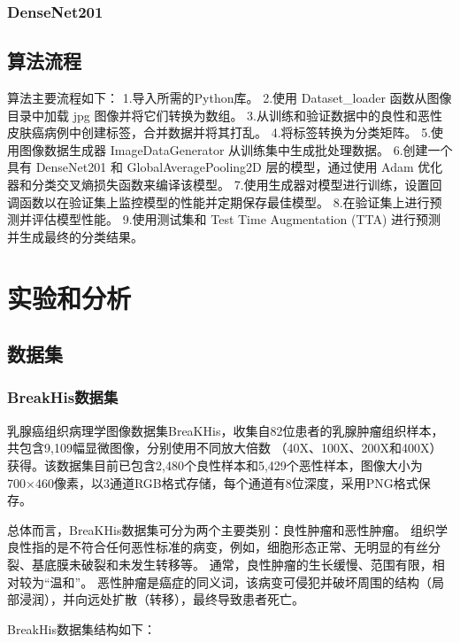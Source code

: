 \documentclass[AutoFakeBold]{LZUThesis}
\begin{document}
\subsection{DenseNet201}

\section{算法流程}

算法主要流程如下：
1.导入所需的Python库。
2.使用 Dataset_loader 函数从图像目录中加载 jpg 图像并将它们转换为数组。
3.从训练和验证数据中的良性和恶性皮肤癌病例中创建标签，合并数据并将其打乱。
4.将标签转换为分类矩阵。
5.使用图像数据生成器 ImageDataGenerator 从训练集中生成批处理数据。
6.创建一个具有 DenseNet201 和 GlobalAveragePooling2D 层的模型，通过使用 Adam 优化器和分类交叉熵损失函数来编译该模型。
7.使用生成器对模型进行训练，设置回调函数以在验证集上监控模型的性能并定期保存最佳模型。
8.在验证集上进行预测并评估模型性能。
9.使用测试集和 Test Time Augmentation (TTA) 进行预测并生成最终的分类结果。


\chapter{实验和分析}
\section{数据集}
\subsection{BreakHis数据集}
乳腺癌组织病理学图像数据集BreaKHis，收集自82位患者的乳腺肿瘤组织样本，共包含9,109幅显微图像，分别使用不同放大倍数
（40X、100X、200X和400X）获得。该数据集目前已包含2,480个良性样本和5,429个恶性样本，图像大小为700×460像素，以3通道RGB格式存储，每个通道有8位深度，采用PNG格式保存。

总体而言，BreaKHis数据集可分为两个主要类别：良性肿瘤和恶性肿瘤。
组织学良性指的是不符合任何恶性标准的病变，例如，细胞形态正常、无明显的有丝分裂、基底膜未破裂和未发生转移等。
通常，良性肿瘤的生长缓慢、范围有限，相对较为“温和”。
恶性肿瘤是癌症的同义词，该病变可侵犯并破坏周围的结构（局部浸润），并向远处扩散（转移），最终导致患者死亡。

BreakHis数据集结构如下：
\end{document}
